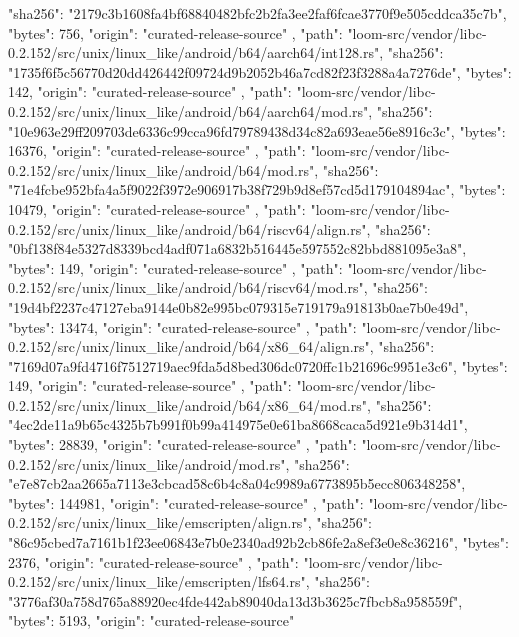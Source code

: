 {{      "sha256": "2179c3b1608fa4bf68840482bfc2b2fa3ee2faf6fcae3770f9e505cddca35c7b",
      "bytes": 756,
      "origin": "curated-release-source"
    },
    {
      "path": "loom-src/vendor/libc-0.2.152/src/unix/linux_like/android/b64/aarch64/int128.rs",
      "sha256": "1735f6f5c56770d20dd426442f09724d9b2052b46a7cd82f23f3288a4a7276de",
      "bytes": 142,
      "origin": "curated-release-source"
    },
    {
      "path": "loom-src/vendor/libc-0.2.152/src/unix/linux_like/android/b64/aarch64/mod.rs",
      "sha256": "10e963e29ff209703de6336c99cca96fd79789438d34c82a693eae56e8916c3c",
      "bytes": 16376,
      "origin": "curated-release-source"
    },
    {
      "path": "loom-src/vendor/libc-0.2.152/src/unix/linux_like/android/b64/mod.rs",
      "sha256": "71e4fcbe952bfa4a5f9022f3972e906917b38f729b9d8ef57cd5d179104894ac",
      "bytes": 10479,
      "origin": "curated-release-source"
    },
    {
      "path": "loom-src/vendor/libc-0.2.152/src/unix/linux_like/android/b64/riscv64/align.rs",
      "sha256": "0bf138f84e5327d8339bcd4adf071a6832b516445e597552c82bbd881095e3a8",
      "bytes": 149,
      "origin": "curated-release-source"
    },
    {
      "path": "loom-src/vendor/libc-0.2.152/src/unix/linux_like/android/b64/riscv64/mod.rs",
      "sha256": "19d4bf2237c47127eba9144e0b82e995bc079315e719179a91813b0ae7b0e49d",
      "bytes": 13474,
      "origin": "curated-release-source"
    },
    {
      "path": "loom-src/vendor/libc-0.2.152/src/unix/linux_like/android/b64/x86_64/align.rs",
      "sha256": "7169d07a9fd4716f7512719aec9fda5d8bed306dc0720ffc1b21696c9951e3c6",
      "bytes": 149,
      "origin": "curated-release-source"
    },
    {
      "path": "loom-src/vendor/libc-0.2.152/src/unix/linux_like/android/b64/x86_64/mod.rs",
      "sha256": "4ec2de11a9b65c4325b7b991f0b99a414975e0e61ba8668caca5d921e9b314d1",
      "bytes": 28839,
      "origin": "curated-release-source"
    },
    {
      "path": "loom-src/vendor/libc-0.2.152/src/unix/linux_like/android/mod.rs",
      "sha256": "e7e87cb2aa2665a7113e3cbcad58c6b4c8a04c9989a6773895b5ecc806348258",
      "bytes": 144981,
      "origin": "curated-release-source"
    },
    {
      "path": "loom-src/vendor/libc-0.2.152/src/unix/linux_like/emscripten/align.rs",
      "sha256": "86c95cbed7a7161b1f23ee06843e7b0e2340ad92b2cb86fe2a8ef3e0e8c36216",
      "bytes": 2376,
      "origin": "curated-release-source"
    },
    {
      "path": "loom-src/vendor/libc-0.2.152/src/unix/linux_like/emscripten/lfs64.rs",
      "sha256": "3776af30a758d765a88920ec4fde442ab89040da13d3b3625c7fbcb8a958559f",
      "bytes": 5193,
      "origin": "curated-release-source"
}}
